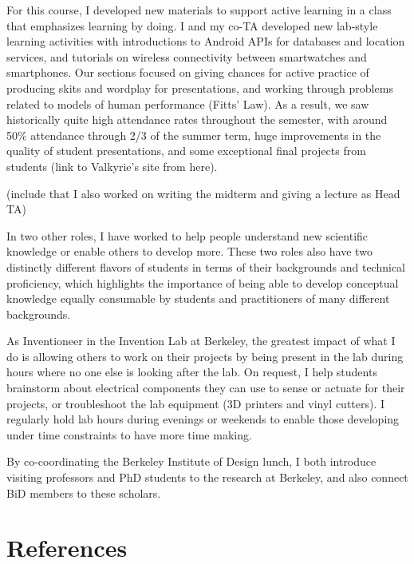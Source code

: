 \documentclass[12pt]{memoir}
\begin{document}
For this course, I developed new materials to support active learning in a class that emphasizes learning by doing.
I and my co-TA developed new lab-style learning activities with introductions to Android APIs for databases and location services, and tutorials on wireless connectivity between smartwatches and smartphones.
Our sections focused on giving chances for active practice of producing skits and wordplay for presentations, and working through problems related to models of human performance (Fitts' Law).
As a result, we saw historically quite high attendance rates throughout the semester, with around 50\% attendance through 2/3 of the summer term, huge improvements in the quality of student presentations, and some exceptional final projects from students (link to Valkyrie's site from here).

(include that I also worked on writing the midterm and giving a lecture as Head TA)

In two other roles, I have worked to help people understand new scientific knowledge or enable others to develop more.
These two roles also have two distinctly different flavors of students in terms of their backgrounds and technical proficiency, which highlights the importance of being able to develop conceptual knowledge equally consumable by students and practitioners of many different backgrounds.

As Inventioneer in the Invention Lab at Berkeley, the greatest impact of what I do is allowing others to work on their projects by being present in the lab during hours where no one else is looking after the lab.
On request, I help students brainstorm about electrical components they can use to sense or actuate for their projects, or troubleshoot the lab equipment (3D printers and vinyl cutters).
I regularly hold lab hours during evenings or weekends to enable those developing under time constraints to have more time making.

By co-coordinating the Berkeley Institute of Design lunch, I both introduce visiting professors and PhD students to the research at Berkeley, and also connect BiD members to these scholars.

\section{References}
\printbibliography[heading=none]
\end{document}
